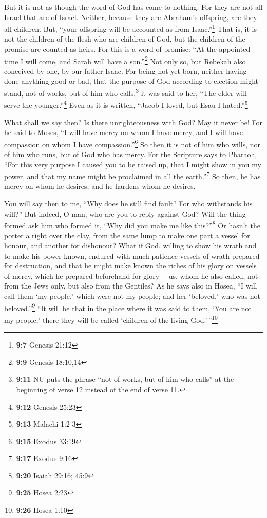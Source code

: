  But it is not as though the word of God has come to
nothing. For they are not all Israel that are of Israel. 
Neither, because they are Abraham's offspring, are they all children.
But, ``your offspring will be accounted as from Isaac.''\footnote{\textbf{9:7}
  Genesis 21:12}  That is, it is not the children of the
flesh who are children of God, but the children of the promise are
counted as heirs.  For this is a word of promise: ``At the
appointed time I will come, and Sarah will have a son.''\footnote{\textbf{9:9}
  Genesis 18:10,14}  Not only so, but Rebekah also
conceived by one, by our father Isaac.  For being not yet
born, neither having done anything good or bad, that the purpose of God
according to election might stand, not of works, but of him who
calls,\footnote{\textbf{9:11} NU puts the phrase ``not of works, but of
  him who calls'' at the beginning of verse 12 instead of the end of
  verse 11.}  it was said to her, ``The elder will serve
the younger.''\footnote{\textbf{9:12} Genesis 25:23} 
Even as it is written, ``Jacob I loved, but Esau I hated.''\footnote{\textbf{9:13}
  Malachi 1:2-3}

 What shall we say then? Is there unrighteousness with
God? May it never be!  For he said to Moses, ``I will
have mercy on whom I have mercy, and I will have compassion on whom I
have compassion.''\footnote{\textbf{9:15} Exodus 33:19} 
So then it is not of him who wills, nor of him who runs, but of God who
has mercy.  For the Scripture says to Pharaoh, ``For this
very purpose I caused you to be raised up, that I might show in you my
power, and that my name might be proclaimed in all the
earth.''\footnote{\textbf{9:17} Exodus 9:16}  So then, he
has mercy on whom he desires, and he hardens whom he desires.

 You will say then to me, ``Why does he still find fault?
For who withstands his will?''  But indeed, O man, who
are you to reply against God? Will the thing formed ask him who formed
it, ``Why did you make me like this?''\footnote{\textbf{9:20} Isaiah
  29:16; 45:9}  Or hasn't the potter a right over the
clay, from the same lump to make one part a vessel for honour, and
another for dishonour?  What if God, willing to show his
wrath and to make his power known, endured with much patience vessels of
wrath prepared for destruction,  and that he might make
known the riches of his glory on vessels of mercy, which he prepared
beforehand for glory---  us, whom he also called, not
from the Jews only, but also from the Gentiles?  As he
says also in Hosea, ``I will call them `my people,' which were not my
people; and her `beloved,' who was not beloved.''\footnote{\textbf{9:25}
  Hosea 2:23}  ``It will be that in the place where it
was said to them, `You are not my people,' there they will be called
`children of the living God.'\,''\footnote{\textbf{9:26} Hosea 1:10}

